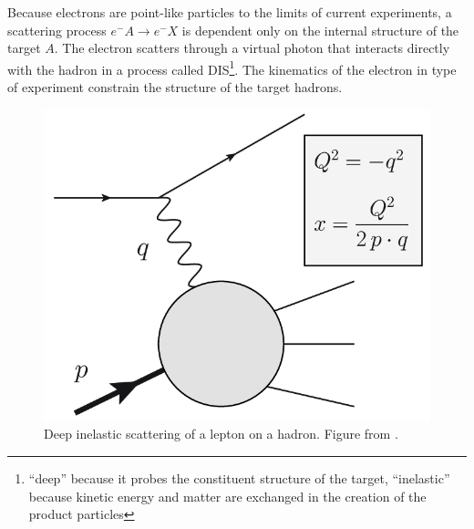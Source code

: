 Because electrons are point-like particles to the limits of current experiments, a scattering process $e^- A \rightarrow e^- X$ is dependent only on the internal structure of the target $A$.
The electron scatters through a virtual photon that interacts directly with the hadron in a process called \ac{DIS}\footnote{``deep'' because it probes the constituent structure of the target, ``inelastic'' because kinetic energy and matter are exchanged in the creation of the product particles}.
The kinematics of the electron in type of experiment constrain the structure of the target hadrons.

\begin{figure}[t]
  \includegraphics{dis_electron_proton.png}
  \caption{Deep inelastic scattering of a lepton on a hadron. Figure from .
}
  \label{fig:dis}
\end{figure}

